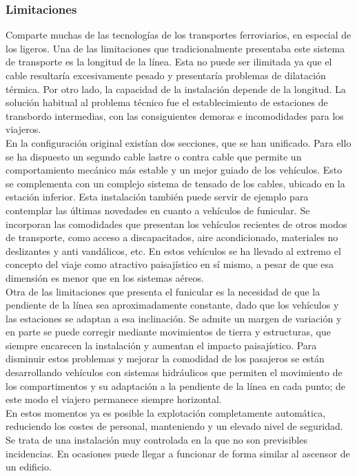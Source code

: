 \documentclass{article}
\begin{document}
\subsubsection{Limitaciones} 
Comparte muchas de las tecnologías de los transportes ferroviarios, en especial de los ligeros. Una de las limitaciones que tradicionalmente presentaba este sistema de transporte es la longitud de la línea. Esta no puede ser ilimitada ya que el cable resultaría excesivamente pesado y presentaría problemas de dilatación térmica. Por otro lado, la capacidad de la instalación depende de la longitud. La solución habitual al problema técnico fue el establecimiento de estaciones de transbordo intermedias, con las consiguientes demoras e incomodidades para los viajeros.\\
En la configuración original existían dos secciones, que se han unificado. Para ello se ha dispuesto un segundo cable lastre o contra cable que permite un comportamiento mecánico más estable y un mejor guiado de los vehículos. Esto se complementa con un complejo sistema de tensado de los cables, ubicado en la estación inferior. Esta instalación también puede servir de ejemplo para contemplar las últimas novedades en cuanto a vehículos de funicular. Se incorporan las comodidades que presentan los vehículos recientes de otros modos de transporte, como acceso a discapacitados, aire acondicionado, materiales no deslizantes y anti vandálicos, etc. En estos vehículos se ha llevado al extremo el concepto del viaje como atractivo paisajístico en sí mismo, a pesar de que esa dimensión es menor que en los sistemas aéreos. \\
Otra de las limitaciones que presenta el funicular es la necesidad de que la pendiente de la línea sea aproximadamente constante, dado que los vehículos y las estaciones se adaptan a esa inclinación. Se admite un margen de variación y en parte se puede corregir mediante movimientos de tierra y estructuras, que siempre encarecen la instalación y aumentan el impacto paisajístico. Para disminuir estos problemas y mejorar la comodidad de los pasajeros se están desarrollando vehículos con sistemas hidráulicos que permiten el movimiento de los compartimentos y su adaptación a la pendiente de la línea en cada punto; de este modo el viajero permanece siempre horizontal. \\
En estos momentos ya es posible la explotación completamente automática, reduciendo los costes de personal, manteniendo y un elevado nivel de seguridad. Se trata de una instalación muy controlada en la que no son previsibles incidencias. En ocasiones puede llegar a funcionar de forma similar al ascensor de un edificio\cite{rf3}. 
\end{document}
